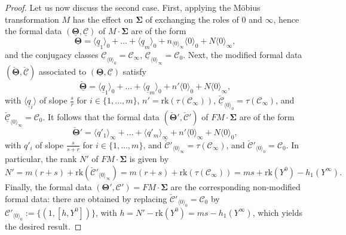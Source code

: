 \documentclass[11pt,a4paper]{amsart}
\numberwithin{equation}{section}
\newcommand{\cir}[1]{\langle #1 \rangle}
\begin{document}
\begin{proof}
Let us now discuss the second case. First, applying the Möbius transformation $M$ has the effect on $\mathbf \Sigma$ of exchanging the roles of $0$ and $\infty$, hence the formal data $(\bm{\underline{\Theta}}, \bm{\underline{\mathcal C}})$ of $M\cdot \bm\Sigma$ are of the form
\[
\bm{\underline\Theta}=\cir{\underline q_1}_0+\dots+ \cir{\underline q_m}_0+ n_{\cir{0}_\infty} \cir{0}_0+ N\cir{0}_\infty,
\]
and the conjugacy classes $\underline{\mathcal C}_{\cir{0}_0}=\mathcal C_\infty$, $\underline{\mathcal C}_{\cir{0}_\infty}=\mathcal C_0$. 
Next, the modified formal data $(\underline{\bm{\breve{\Theta}}},\underline{\bm{\breve{\mathcal C}}})$ associated to $(\bm{\underline{\Theta}}, \bm{\underline{\mathcal C}})$ satisfy
\[
\bm{\breve{\underline\Theta}}=\cir{\underline q_1}_0+\dots+ \cir{\underline q_m}_0+ n' \cir{0}_0+ N\cir{0}_\infty,
\]
with $\cir{\underline q_i}$ of slope $\frac{s}{r}$ for $i\in \{1, \dots, m\}$,  $n'=\mathrm{rk}(\tau(\mathcal C_\infty))$, $\underline{\breve{\mathcal C}}_{\cir{0}_0}=\tau(\mathcal C_\infty)$, and $\underline{\breve{\mathcal C}}_{\cir{0}_\infty}=\mathcal C_0$. 
It follows that the formal data $(\bm{\breve\Theta}', \bm{\breve{\mathcal C}}')$ of $FM\cdot \bm\Sigma$ are of the form
\[
\bm{\breve{\Theta}}'=\cir{q'_1}_\infty+\dots+\cir{q'_m}_\infty+ n' \cir{0}_\infty+ N\cir{0}_0,
\]
with $q'_i$ of slope $\frac{s}{s+r}$ for $i\in\{1, \dots, m\}$, and $\breve{\mathcal C}'_{\cir{0}_\infty}=\tau(\mathcal C_\infty)$, and $\breve{\mathcal C}'_{\cir{0}_0}=\mathcal C_0$. 
In particular, the rank $N'$ of $FM\cdot \bm\Sigma$ is given by
\[
N'=m(r+s)+\mathrm{rk}(\breve{\mathcal C}'_{\cir{0}_\infty})=m(r+s)+\mathrm{rk}(\tau(\mathcal C_\infty))=ms +\mathrm{rk}(Y^0)-h_1(Y^\infty).
\]
Finally, the formal data $(\bm\Theta', \bm{\mathcal C}')=FM\cdot \bm\Sigma$ are the corresponding non-modified formal data: there are obtained by replacing $\breve{\mathcal C}'_{\cir{0}_0}=\mathcal C_0$ by $\mathcal C'_{\cir{0}_0}:=\{(1,[h,Y^0])\}$, with $h=N'-\mathrm{rk}(Y^0)=ms-h_1(Y^\infty)$, which yields the desired result.


\end{proof}
\end{document}
